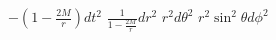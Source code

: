 
$-(1 - \frac{2M}{r}) dt^2$
$\frac{1}{1 - \frac{2M}{r}} dr^2$
$r^2 d\theta^2$
$r^2\sin^2\theta d\phi^2$
